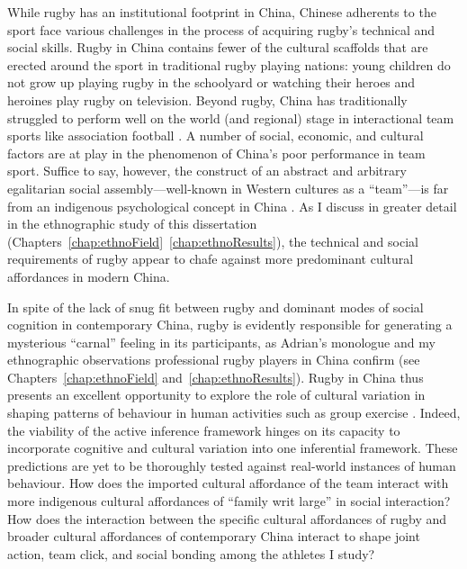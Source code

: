 \begin{CJK}{UTF8}{gbsn}
While rugby has an institutional footprint in China, Chinese adherents to the sport face various challenges in the process of acquiring rugby's technical and social skills.  Rugby in China contains fewer of the cultural scaffolds that are erected around the sport in traditional rugby playing nations: young children do not grow up playing rugby in the schoolyard or watching their heroes and heroines play rugby on television.  Beyond rugby, China has traditionally struggled to perform well on the world (and regional) stage in interactional team sports like association football \citep{Gallagher2018}.  A number of social, economic, and cultural factors are at play in the phenomenon of China's poor performance in team sport.  Suffice to say, however, the construct of an abstract and arbitrary egalitarian social assembly---well-known in Western cultures as a ``team''---is far from an indigenous psychological concept in China \cite[instead, the family functions as a primary metaphor for social interaction][]{Liu2009}.  As I discuss in greater detail in the ethnographic study of this dissertation (Chapters~\ref{chap:ethnoField}\nobreakdash~\ref{chap:ethnoResults}), the technical and social requirements of rugby appear to chafe against more predominant cultural affordances in modern China.

In spite of the lack of snug fit between rugby and dominant modes of social cognition in contemporary China, rugby is evidently responsible for generating a mysterious ``carnal'' feeling in its participants, as Adrian's monologue and my ethnographic observations professional rugby players in China confirm (see Chapters~\ref{chap:ethnoField} and~\ref{chap:ethnoResults}).  Rugby in China thus presents an excellent opportunity to explore the role of cultural variation in shaping patterns of behaviour in human activities such as group exercise \citep{Ramstead2016,Mesoudi2013}.  Indeed, the viability of the active inference framework hinges on its capacity to incorporate cognitive and cultural variation into one inferential framework.  These predictions are yet to be thoroughly tested against real-world instances of human behaviour.  How does the imported cultural affordance of the team interact with more indigenous cultural affordances of ``family writ large'' in social interaction?  How does the interaction between the specific cultural affordances of rugby and broader cultural affordances of contemporary China interact to shape joint action, team click, and social bonding among the athletes I study?


\end{CJK}

